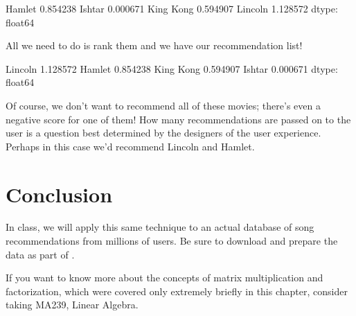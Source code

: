 \documentclass[letterpaper,10pt,english]{sphinxmanual}
\begin{document}
\begin{sphinxVerbatim}[commandchars=\\\{\}]
\PYG{p}{[}\PYG{p}{]}
\end{sphinxVerbatim}

\begin{sphinxVerbatim}[commandchars=\\\{\}]
Hamlet       0.854238
Ishtar      \PYGZhy{}0.000671
King Kong    0.594907
Lincoln      1.128572
dtype: float64
\end{sphinxVerbatim}

All we need to do is rank them and we have our recommendation list!

\begin{sphinxVerbatim}[commandchars=\\\{\}]
\PYG{p}{[}\PYG{p}{]}  
\end{sphinxVerbatim}

\begin{sphinxVerbatim}[commandchars=\\\{\}]
Lincoln      1.128572
Hamlet       0.854238
King Kong    0.594907
Ishtar      \PYGZhy{}0.000671
dtype: float64
\end{sphinxVerbatim}

Of course, we don’t want to recommend all of these movies; there’s even a negative score for one of them!  How many recommendations are passed on to the user is a question best determined by the designers of the user experience.  Perhaps in this case we’d recommend Lincoln and Hamlet.


\section{Conclusion}
\label{\detokenize{chapter-16-matrices:conclusion}}
In class, we will apply this same technique to an actual database of song recommendations from millions of users.  Be sure to download and prepare the data as part of .

If you want to know more about the concepts of matrix multiplication and factorization, which were covered only extremely briefly in this chapter, consider taking MA239, Linear Algebra.
\end{document}
